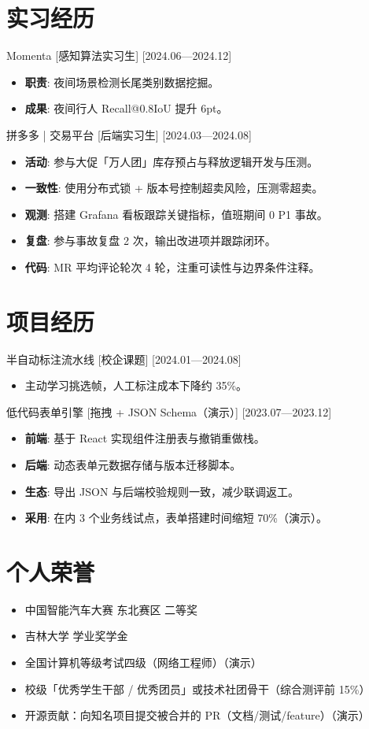 \documentclass{resume-photo}
\begin{document}
\section{实习经历}
\ResumeItem
{Momenta}
[\textnormal{感知算法实习生}]
[2024.06—2024.12]

\begin{itemize}
  \item \textbf{职责}: 夜间场景检测长尾类别数据挖掘。
  \item \textbf{成果}: 夜间行人 Recall@0.8IoU 提升 6pt。
\end{itemize}


\ResumeItem
{拼多多 | 交易平台}
[\textnormal{后端实习生}]
[2024.03—2024.08]

\begin{itemize}
  \item \textbf{活动}: 参与大促「万人团」库存预占与释放逻辑开发与压测。
  \item \textbf{一致性}: 使用分布式锁 + 版本号控制超卖风险，压测零超卖。
  \item \textbf{观测}: 搭建 Grafana 看板跟踪关键指标，值班期间 0 P1 事故。
  \item \textbf{复盘}: 参与事故复盘 2 次，输出改进项并跟踪闭环。
  \item \textbf{代码}: MR 平均评论轮次 4 轮，注重可读性与边界条件注释。
\end{itemize}



\section{项目经历}
\ResumeItem
{半自动标注流水线}
[\textnormal{校企课题}]
[2024.01—2024.08]

\begin{itemize}
  \item 主动学习挑选帧，人工标注成本下降约 35\%。
\end{itemize}


\ResumeItem
{低代码表单引擎}
[\textnormal{拖拽 + JSON Schema（演示）}]
[2023.07—2023.12]

\begin{itemize}
  \item \textbf{前端}: 基于 React 实现组件注册表与撤销重做栈。
  \item \textbf{后端}: 动态表单元数据存储与版本迁移脚本。
  \item \textbf{生态}: 导出 JSON 与后端校验规则一致，减少联调返工。
  \item \textbf{采用}: 在内 3 个业务线试点，表单搭建时间缩短 70\%（演示）。
\end{itemize}



\section{个人荣誉}
\begin{itemize}
  \item 中国智能汽车大赛 东北赛区 二等奖
  \item 吉林大学 学业奖学金
  \item 全国计算机等级考试四级（网络工程师）（演示）
  \item 校级「优秀学生干部 / 优秀团员」或技术社团骨干（综合测评前 15\%）
  \item 开源贡献：向知名项目提交被合并的 PR（文档/测试/feature）（演示）
\end{itemize}
\end{document}
